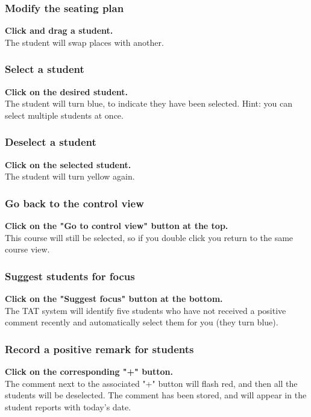 \documentclass[10pt]{article}
\begin{document}
\subsubsection{Modify the seating plan}
\textbf{Click and drag a student.} \\
The student will swap places with another.

\subsubsection{Select a student}
\textbf{Click on the desired student.} \\
The student will turn blue, to indicate they have been selected. Hint: you can select multiple students at once.

\subsubsection{Deselect a student}
\textbf{Click on the selected student.} \\
The student will turn yellow again. 

\subsubsection{Go back to the control view}
\textbf{Click on the "Go to control view" button at the top.} \\
This course will still be selected, so if you double click you return to the same course view.

\subsubsection{Suggest students for focus}
\textbf{Click on the "Suggest focus" button at the bottom.} \\
The TAT system will identify five students who have not received a positive comment recently and automatically select them for you (they turn blue). 

\subsubsection{Record a positive remark for students}
\textbf{Click on the corresponding "+" button.} \\
The comment next to the associated "+" button will flash red, and then all the students will be deselected. The comment has been stored, and will appear in the student reports with today's date. 
\end{document}
